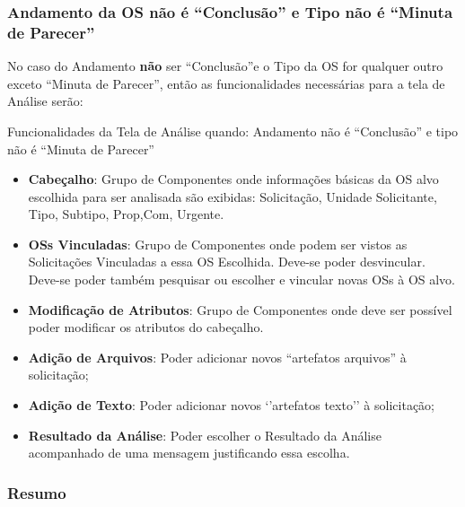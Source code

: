 \subsubsection{Andamento da OS não é ``Conclusão'' e  Tipo não é ``Minuta de Parecer''}


No caso do Andamento \textbf{não} ser ``Conclusão''e o Tipo da OS for qualquer outro exceto ``Minuta de Parecer'', então as funcionalidades necessárias para a tela de Análise serão:

\begin{nota}[1]{Funcionalidades da Tela de Análise quando: Andamento não é ``Conclusão'' e tipo não é ``Minuta de Parecer''}
	\begin{itemize}
		\item \textbf{Cabeçalho}: Grupo de Componentes onde informações básicas da OS alvo escolhida para ser analisada são exibidas: Solicitação, Unidade Solicitante, Tipo, Subtipo, Prop,Com, Urgente.

		\item \textbf{OSs Vinculadas}: Grupo de Componentes onde podem ser vistos as Solicitações Vinculadas a essa OS Escolhida. Deve-se poder desvincular. Deve-se poder também pesquisar ou escolher e vincular novas OSs à OS alvo.	
		
		\item \textbf{Modificação de Atributos}: Grupo de Componentes onde deve ser possível poder modificar os atributos do cabeçalho.		
		
		\item \textbf{Adição de Arquivos}: Poder adicionar novos ``artefatos arquivos'' à solicitação;
		
		\item \textbf{Adição de Texto}: Poder adicionar novos `'artefatos texto'' à solicitação;

		\item \textbf{Resultado da Análise}: Poder escolher o Resultado da Análise acompanhado de uma mensagem justificando essa escolha.		
	\end{itemize}
\end{nota}

\subsubsection{Resumo}


\newcommand{\specialcell}[2][c]{%
	\begin{tabular}[#1]{@{}c@{}}#2\end{tabular}}

